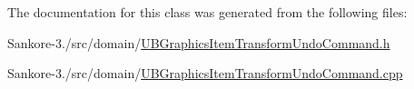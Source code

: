 The documentation for this class was generated from the following files\-:\begin{DoxyCompactItemize}
\item 
Sankore-\/3./src/domain/\hyperlink{_u_b_graphics_item_transform_undo_command_8h}{U\-B\-Graphics\-Item\-Transform\-Undo\-Command.\-h}\item 
Sankore-\/3./src/domain/\hyperlink{_u_b_graphics_item_transform_undo_command_8cpp}{U\-B\-Graphics\-Item\-Transform\-Undo\-Command.\-cpp}\end{DoxyCompactItemize}
